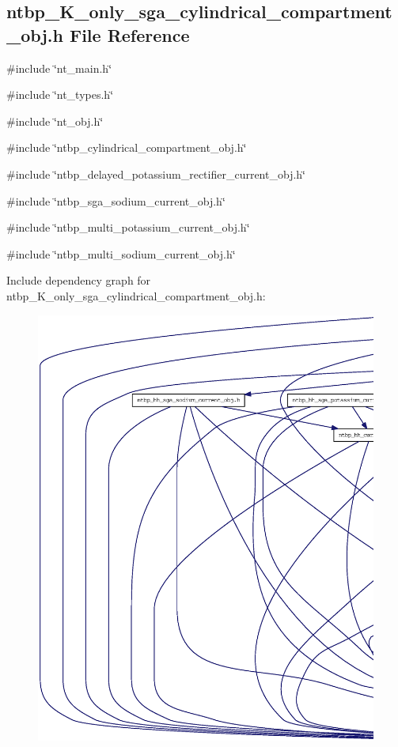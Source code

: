 \subsection{ntbp\_\-K\_\-only\_\-sga\_\-cylindrical\_\-compartment\_\-obj.h File Reference}
\label{ntbp___k__only__sga__cylindrical__compartment__obj_8h}
{\ttfamily \#include \char`\"{}nt\_\-main.h\char`\"{}}\par
{\ttfamily \#include \char`\"{}nt\_\-types.h\char`\"{}}\par
{\ttfamily \#include \char`\"{}nt\_\-obj.h\char`\"{}}\par
{\ttfamily \#include \char`\"{}ntbp\_\-cylindrical\_\-compartment\_\-obj.h\char`\"{}}\par
{\ttfamily \#include \char`\"{}ntbp\_\-delayed\_\-potassium\_\-rectifier\_\-current\_\-obj.h\char`\"{}}\par
{\ttfamily \#include \char`\"{}ntbp\_\-sga\_\-sodium\_\-current\_\-obj.h\char`\"{}}\par
{\ttfamily \#include \char`\"{}ntbp\_\-multi\_\-potassium\_\-current\_\-obj.h\char`\"{}}\par
{\ttfamily \#include \char`\"{}ntbp\_\-multi\_\-sodium\_\-current\_\-obj.h\char`\"{}}\par
Include dependency graph for ntbp\_\-K\_\-only\_\-sga\_\-cylindrical\_\-compartment\_\-obj.h:
\nopagebreak
\begin{figure}[H]
\begin{center}
\leavevmode
\includegraphics[width=400pt]{ntbp___k__only__sga__cylindrical__compartment__obj_8h__incl}
\end{center}
\end{figure}

